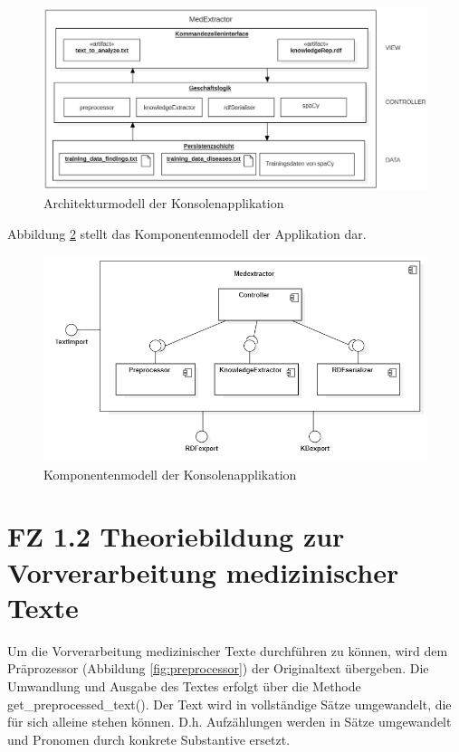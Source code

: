 \begin{figure}[h]
    \centering
    \includegraphics[width=\textwidth]{pictures/Architekturmodell.png}
    \caption{Architekturmodell der Konsolenapplikation}
    \label{fig:architekturmodell}
\end{figure}

Abbildung \ref{fig:komponentendiagramm} stellt das Komponentenmodell der Applikation dar.

\begin{figure}[h]
    \centering
    \includegraphics[width=\textwidth]{pictures/ComponentDiagram.png}
    \caption{Komponentenmodell der Konsolenapplikation}
    \label{fig:komponentendiagramm}
\end{figure}





\section{FZ 1.2 Theoriebildung zur Vorverarbeitung medizinischer Texte}
\label{sec:FZ1.2} 

Um die Vorverarbeitung medizinischer Texte durchführen zu können, wird dem Präprozessor (Abbildung \ref{fig:preprocessor}) der Originaltext übergeben. Die Umwandlung und Ausgabe des Textes erfolgt über die Methode get\_preprocessed\_text(). Der Text wird in vollständige Sätze umgewandelt, die für sich alleine stehen können. D.h. Aufzählungen werden in Sätze umgewandelt und Pronomen durch konkrete Substantive ersetzt. 

